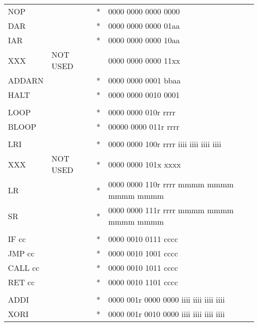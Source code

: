 \documentclass[oneside,english,a4paper,10pt,oneside,openany,final]{memoir}
\begin{document}
\begin{center}
\begin{longtable}{TllT}
NOP         &          & *  & 0000 0000 0000 0000                     \\
DAR         &          & *  & 0000 0000 0000 01aa                     \\
IAR         &          & *  & 0000 0000 0000 10aa                     \\
XXX         & NOT USED &    & 0000 0000 0000 11xx                     \\
ADDARN      &          & *  & 0000 0000 0001 bbaa                     \\
HALT        &          & *  & 0000 0000 0010 0001                     \\
            &          &    &                                         \\
LOOP        &          & *  & 0000 0000 010r rrrr                     \\
BLOOP       &          & *  & 00000 0000 011r rrrr                    \\
            &          &    &                                         \\
LRI         &          & *  & 0000 0000 100r rrrr iiii iiii iiii iiii \\
XXX         & NOT USED & *  & 0000 0000 101x xxxx                     \\
LR          &          & *  & 0000 0000 110r rrrr mmmm mmmm mmmm mmmm \\
SR          &          & *  & 0000 0000 111r rrrr mmmm mmmm mmmm mmmm \\
            &          &    &                                         \\
IF cc       &          & *  & 0000 0010 0111 cccc                     \\
JMP cc      &          & *  & 0000 0010 1001 cccc                     \\
CALL cc     &          & *  & 0000 0010 1011 cccc                     \\
RET cc      &          & *  & 0000 0010 1101 cccc                     \\
            &          &    &                                         \\
ADDI        &          & *  & 0000 001r 0000 0000 iiii iiii iiii iiii \\
XORI        &          & *  & 0000 001r 0010 0000 iiii iiii iiii iiii \\

\end{longtable}
\end{center}
\end{document}
